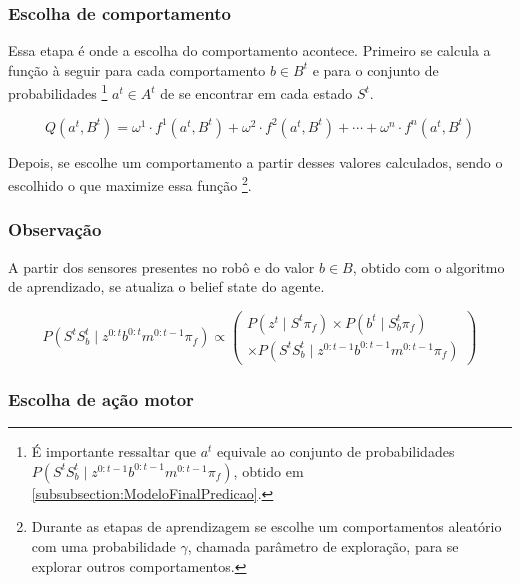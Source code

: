 \subsubsection{Escolha de comportamento}

Essa etapa é onde a escolha do comportamento acontece. Primeiro se calcula a função à seguir para cada comportamento $ b \in B^t $ e para o conjunto de probabilidades%
\footnote{É importante ressaltar que $ a^t $ equivale ao conjunto de probabilidades $ P \left( S^t S_b^t \mid z^{0: t-1} b^{0: t-1} m^{0: t-1} \pi_f \right) $, obtido em \ref{subsubsection:ModeloFinalPredicao}.%
} $ a^t \in A^t $ de se encontrar em cada estado $ S^t $.

\begin{equation}
    	Q \left( a^t, B^t \right) = \omega^1 \cdot f^1 \left( a^t, B^t \right) + \omega^2 \cdot f^2 \left( a^t, B^t \right) + \cdots + \omega^n \cdot f^n \left( a^t, B^t \right)
\end{equation}

Depois, se escolhe um comportamento a partir desses valores calculados, sendo o escolhido o que maximize essa função%
\footnote{Durante as etapas de aprendizagem se escolhe um comportamentos aleatório com uma probabilidade $ \gamma $, chamada parâmetro de exploração, para se explorar outros comportamentos.}.


\subsubsection{Observação}

A partir dos sensores presentes no robô e do valor $ b \in B $, obtido com o algoritmo de aprendizado, se atualiza o belief state do agente.

\begin{equation}
    P \left( S^t S_b^t \mid z^{0: t} b^{0: t} m^{0: t-1} \pi_f \right) \propto
        \left(
            \begin{array}{l}
                P \left( z^t \mid S^t \pi_f \right) \times P \left( b^t \mid S_b^t \pi_f \right) \\
                \times P \left( S^t S_b^t \mid z^{0: t-1} b^{0: t-1} m^{0: t-1} \pi_f \right)
            \end{array}
        \right)
\end{equation}


\subsubsection{Escolha de ação motor}

